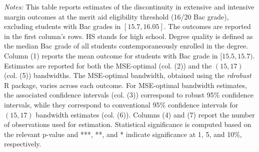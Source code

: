 \begin{table}[!h]
{\begin{threeparttable}
\begin{tablenotes}[para]
\item \textit{Notes:} This table reports estimates of the discontinuity in extensive and intensive margin outcomes at the merit aid eligibility threshold (16/20 Bac grade), excluding students with Bac grades in $[15.7, 16.05]$. The outcomes are reported in the first column's rows. HS stands for high school. Degree quality is defined as the median Bac grade of all students contemporaneously enrolled in the degree. Column (1) reports the mean outcome for students with Bac grade in $[15.5, 15.7)$. Estimates are reported for both the MSE-optimal (col. (2)) and the $(15, 17)$ (col. (5)) bandwidths. The MSE-optimal bandwidth, obtained using the \textit{rdrobust} R package, varies across each outcome. For MSE-optimal bandwidth estimates, the associated confidence intervals (col. (3)) correspond to robust 95\% confidence intervals, while they correspond to conventional 95\% confidence intervals for $(15, 17)$ bandwidth estimates (col. (6)). Columns (4) and (7) report the number of observations used for estimation. Statistical significance is computed based on the relevant p-value and ***, **, and * indicate significance at 1, 5, and 10\%, respectively.
\end{tablenotes}
\end{threeparttable}}
\end{table}
